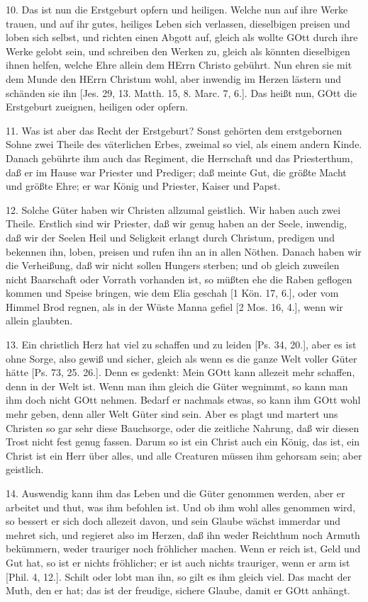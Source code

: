 10. Das ist nun die Erstgeburt opfern und heiligen. Welche nun auf ihre Werke trauen, und auf ihr gutes, heiliges Leben sich verlassen, dieselbigen preisen und loben sich selbst, und richten einen Abgott auf, gleich als wollte GOtt durch ihre Werke gelobt sein, und schreiben den Werken zu, gleich als könnten dieselbigen ihnen helfen, welche Ehre allein dem HErrn Christo gebührt. Nun ehren sie mit dem Munde den HErrn Christum wohl, aber inwendig im Herzen lästern und schänden sie ihn [Jes. 29, 13. Matth. 15, 8. Marc. 7, 6.]. Das heißt nun, GOtt die Erstgeburt zueignen, heiligen oder opfern.

11. Was ist aber das Recht der Erstgeburt? Sonst gehörten dem erstgebornen Sohne zwei Theile des väterlichen Erbes, zweimal so viel,
als einem andern Kinde. Danach gebührte ihm auch das Regiment, die Herrschaft und das Priesterthum, daß er im Hause war Priester und Prediger; daß meinte Gut, die größte Macht und größte Ehre; er war König und Priester, Kaiser und Papst.

12. Solche Güter haben wir Christen allzumal geistlich. Wir haben auch zwei Theile. Erstlich sind wir Priester, daß wir genug haben an der Seele, inwendig, daß wir der Seelen Heil und Seligkeit erlangt durch Christum, predigen und bekennen ihn, loben, preisen und rufen ihn an in allen Nöthen. Danach haben wir die Verheißung, daß wir nicht sollen Hungers sterben; und ob gleich zuweilen nicht Baarschaft oder Vorrath vorhanden ist, so müßten ehe die Raben geflogen kommen und Speise bringen, wie dem Elia geschah [1 Kön. 17, 6.], oder vom Himmel Brod regnen, als in der Wüste Manna gefiel [2 Mos. 16, 4.], wenn wir allein glaubten.

13. Ein christlich Herz hat viel zu schaffen und zu leiden [Ps. 34, 20.], aber es ist ohne Sorge, also gewiß und sicher, gleich als wenn es die ganze Welt voller Güter hätte [Ps. 73, 25. 26.]. Denn es gedenkt: Mein GOtt kann allezeit mehr schaffen, denn in der Welt ist. Wenn man ihm gleich die Güter wegnimmt, so kann man ihm doch nicht GOtt nehmen. Bedarf er nachmals etwas, so kann ihm GOtt wohl mehr geben, denn aller Welt Güter sind sein. Aber es plagt und martert uns Christen so gar sehr diese Bauchsorge, oder die zeitliche Nahrung, daß wir diesen Trost nicht fest genug fassen. Darum so ist ein Christ auch ein König, das ist, ein Christ ist ein Herr über alles, und alle Creaturen müssen ihm gehorsam sein; aber geistlich.

14. Auswendig kann ihm das Leben und die Güter genommen werden, aber er arbeitet und thut, was ihm befohlen ist. Und ob ihm wohl alles genommen wird, so bessert er sich doch allezeit davon, und sein Glaube wächst immerdar und mehret sich, und regieret also im Herzen, daß ihn weder Reichthum noch Armuth bekümmern, weder trauriger noch fröhlicher machen. Wenn er reich ist, Geld und Gut hat, so ist er nichts fröhlicher; er ist auch nichts trauriger, wenn er arm ist [Phil. 4, 12.]. Schilt oder lobt man ihn, so gilt es ihm gleich viel. Das macht der Muth, den er hat; das ist der freudige, sichere Glaube, damit er GOtt anhängt.

